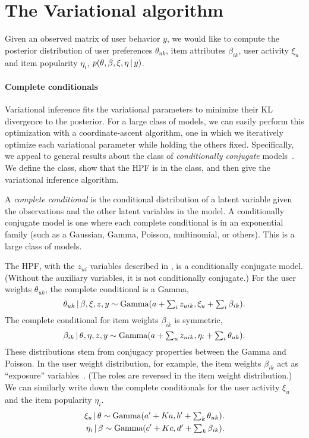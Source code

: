 \section{The Variational algorithm}
Given an observed matrix of user behavior $y$, we would like to
compute the posterior distribution of user preferences $\theta_{uk}$,
item attributes $\beta_{ik}$, user activity $\xi_u$ and item
popularity $\eta_i$, $p(\theta, \beta, \xi, \eta \,\vert\, y)$.

\paragraph{Complete conditionals}
Variational inference fits the variational parameters to minimize
their KL divergence to the posterior. For a large class of models, we
can easily perform this optimization with a coordinate-ascent
algorithm, one in which we iteratively optimize each variational
parameter while holding the others fixed.  Specifically, we appeal to
general results about the class of \textit{conditionally conjugate}
models~\cite{Ghahramani:2001,Hoffman:2013}.  We define the class, show
that the HPF is in the class, and then give the variational inference
algorithm.

A \textit{complete conditional} is the conditional distribution of a
latent variable given the observations and the other latent variables
in the model.  A conditionally conjugate model is one where each
complete conditional is in an exponential family (such as a Gaussian,
Gamma, Poisson, multinomial, or others).  This is a large class of
models.

The HPF, with the $z_{ui}$ variables described in ,
is a conditionally conjugate model.  (Without the auxiliary variables,
it is not conditionally conjugate.) For the user weights
$\theta_{uk}$, the complete conditional is a Gamma,
\begin{equation}
  \label{eq:user-weight-cc}
  \theta_{uk} \,\vert\, \beta, \xi, z, y \sim
  \textrm{Gamma}(a + \textstyle \sum_{i} z_{uik}, \xi_u + \sum_{i} \beta_{ik}).
\end{equation}
The complete conditional for item weights $\beta_{ik}$ is symmetric,
\begin{equation}
  \label{eq:item-weight-cc}
  \beta_{ik} \,\vert\, \theta, \eta, z, y \sim
  \textrm{Gamma}(a + \textstyle \sum_{u} z_{uik}, \eta_i + \sum_{i} \theta_{uk}).
\end{equation}
These distributions stem from conjugacy properties between the Gamma
and Poisson. In the user weight distribution, for example, the item
weights $\beta_{ik}$ act as ``exposure'' variables~\cite{Gelman:1995}.
(The roles are reversed in the item weight distribution.) We can
similarly write down the complete conditionals for the user activity
$\xi_u$ and the item popularity $\eta_i$.
\begin{align}
  \label{eq:user-weight-cc}
  \xi_{u} \,\vert\, \theta \sim
  \textrm{Gamma}(a' + \textstyle Ka, b' + \sum_{k} \theta_{uk}).\nonumber\\
  \eta_{i} \,\vert\, \beta \sim
  \textrm{Gamma}(c' + \textstyle Kc, d' + \sum_{k} \beta_{ik}).\nonumber\\
\end{align}

